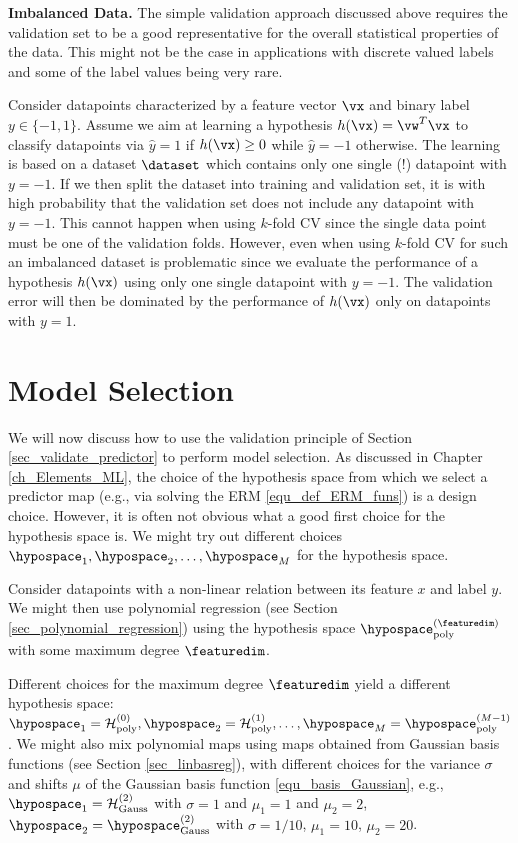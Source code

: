 \documentclass[12pt]{report}
\begin{document}
{\bf Imbalanced Data.} 
The simple validation approach discussed above requires the validation set to be 
a good representative for the overall statistical properties of the data. This might 
not be the case in applications with discrete valued labels and some of the label 
values being very rare. 

Consider datapoints characterized by a feature vector $\vx$ and binary label $y \in \{-1,1\}$. 
Assume we aim at learning a hypothesis $h(\vx) = \vw^{T} \vx$ to classify datapoints 
via $\hat{y}=1$ if $h(\vx) \geq 0$ while $\hat{y}=-1$ otherwise. The learning is based 
on a dataset $\dataset$ which contains only one single (!) datapoint with $y=-1$. If 
we then split the dataset into training and validation set, it is with high probability that 
the validation set does not include any datapoint with $y=-1$. This cannot happen 
when using $k$-fold CV since the single data point must be one of the validation folds. 
However, even when using $k$-fold CV for such an imbalanced dataset is problematic since 
we evaluate the performance of a hypothesis $h(\vx)$ using only one single 
datapoint with $y=-1$. The validation error will then be dominated by the performance 
of $h(\vx)$ only on datapoints with $y=1$. 


\section{Model Selection}
\label{sec_modsel}

We will now discuss how to use the validation principle of 
Section \ref{sec_validate_predictor} to perform model selection. 
As discussed in Chapter \ref{ch_Elements_ML}, the choice of 
the hypothesis space from which we select a predictor map 
(e.g., via solving the ERM \eqref{equ_def_ERM_funs}) is a design choice. 
However, it is often not obvious what a good first choice 
for the hypothesis space is. We might try out different 
choices $\hypospace_{1},\hypospace_{2},\ldots,\hypospace_{M}$ 
for the hypothesis space. 

Consider datapoints with a non-linear relation between its 
feature $x$ and label $y$. We might then use polynomial 
regression (see Section \ref{sec_polynomial_regression}) 
using the hypothesis space $\hypospace_{\rm poly}^{(\featuredim)}$ 
with some maximum degree $\featuredim$. 

Different choices for the maximum degree $\featuredim$ yield 
a different hypothesis space: $\hypospace_{1} = \mathcal{H}_{\rm poly}^{(0)},\hypospace_{2} = \mathcal{H}_{\rm poly}^{(1)},\ldots,\hypospace_{M} = \hypospace_{\rm poly}^{(M-1)}$. 
We might also mix polynomial maps using maps obtained from  
Gaussian basis functions (see Section \ref{sec_linbasreg}), 
with different choices for the variance $\sigma$ and shifts $\mu$ 
of the Gaussian basis function \eqref{equ_basis_Gaussian}, 
e.g., $\hypospace_{1} = \mathcal{H}^{(2)}_{\rm Gauss}$ with $\sigma=1$ and $\mu_{1}=1$ and $\mu_{2}=2$, 
$\hypospace_{2} = \hypospace^{(2)}_{\rm Gauss}$ with $\sigma = 1/10$, $\mu_{1}=10$, $\mu_{2}= 20$.
\end{document}

